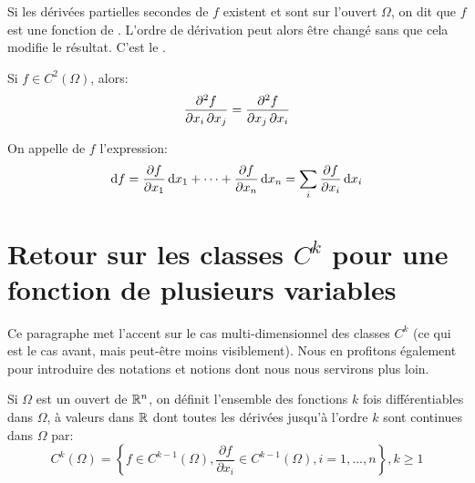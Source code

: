 Si  les dérivées partielles secondes de $f$ existent et sont 
sur l'ouvert $\Omega$, on dit que $f$ est une fonction de .
L'ordre de dérivation peut alors être changé sans que cela modifie le résultat.
C'est le .
\begin{theoreme}
Si $f\in C^2(\Omega)$, alors:
\begin{equation}\colorred
    \frac{\partial^2f}{\partial x_i\, \partial x_j} = \frac{\partial^2f} {\partial x_j\, \partial x_i}
\end{equation}
\end{theoreme}

\begin{definition}
On appelle  de $f$ l'expression:
\begin{equation}
    \mathrm{d}f=\frac{\partial f}{\partial x_1}\,\mathrm{d}x_1+\cdots+\frac{\partial f}{\partial x_n}\,\mathrm{d}x_n
=   \displaystyle\sum_i \frac{\partial f}{\partial x_i}\,\mathrm{d}x_i
\end{equation}
\end{definition}

\ifVersionDuDocEstVincent\medskip\fi
\section{Retour sur les classes $C^k$ pour une fonction de plusieurs variables}

Ce paragraphe met l'accent sur le cas multi-dimensionnel des classes $C^k$
(ce qui est le cas avant, mais peut-être moins visiblement).
Nous en profitons également pour introduire des notations et notions dont nous
nous servirons plus loin.

\ifVersionDuDocEstVincent\medskip\fi
\begin{definition}
Si $\Omega$ est un ouvert de $\mathbb R^n$, on définit l'ensemble des
fonctions $k$ fois différentiables dans $\Omega$, à valeurs
dans $\mathbb R$ dont toutes les dérivées jusqu'à l'ordre $k$ sont continues dans
$\Omega$ par:
\begin{equation}
C^k(\Omega) = \left\{f\in C^{k-1}(\Omega), \dfrac{\partial f}{\partial x_i}\in C^{k-1}(\Omega),
i=1, ..., n\right\}, k\ge 1
\end{equation}
\end{definition}

